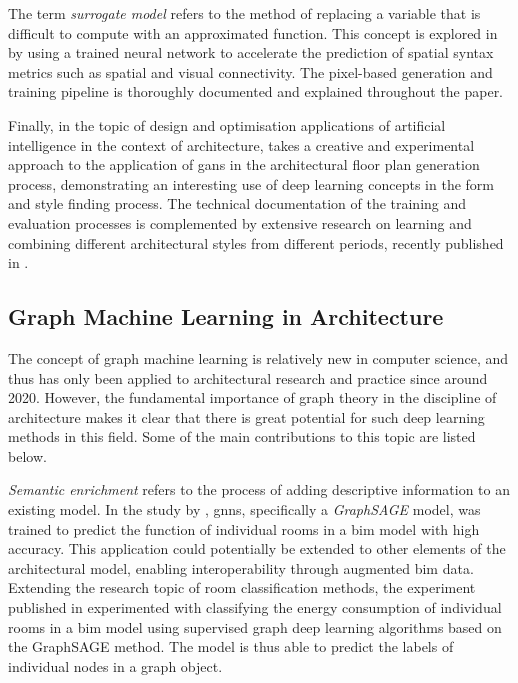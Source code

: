 \documentclass[a4paper, 12pt]{report}
\begin{document}
The term \textit{surrogate model} refers to the method of replacing a variable that is difficult to compute with an approximated function. This concept is explored in  by \citeauthor{tarabishy2020deep} using a trained neural network to accelerate the prediction of spatial syntax metrics such as spatial and visual connectivity. The pixel-based generation and training pipeline is thoroughly documented and explained throughout the paper.

Finally, in the topic of design and optimisation applications of artificial intelligence in the context of architecture, \citeauthor{chaillou2021ai} takes a creative and experimental approach to the application of \acrshort{gans} in the architectural floor plan generation process, demonstrating an interesting use of deep learning concepts in the form and style finding process. The technical documentation of the training and evaluation processes is complemented by extensive research on learning and combining different architectural styles from different periods, recently published in \citeyear{chaillou2021ai}.

\subsection{Graph Machine Learning in Architecture}\label{subsec:graph-machine-learning-in-architecture}

The concept of graph machine learning is relatively new in computer science, and thus has only been applied to architectural research and practice since around 2020. However, the fundamental importance of graph theory in the discipline of architecture makes it clear that there is great potential for such deep learning methods in this field. Some of the main contributions to this topic are listed below.

\textit{Semantic enrichment} refers to the process of adding descriptive information to an existing model. In the study  by \citeauthor{wang2021room}, \acrlong{gnns}, specifically a \textit{GraphSAGE} model, was trained to predict the function of individual rooms in a \acrshort{bim} model with high accuracy. This application could potentially be extended to other elements of the architectural model, enabling interoperability through augmented \acrshort{bim} data. Extending the research topic of room classification methods, the  experiment published in \citeyear{kiavarz2021room} experimented with classifying the energy consumption of individual rooms in a \acrshort{bim} model using supervised graph deep learning algorithms based on the GraphSAGE method. The model is thus able to predict the labels of individual nodes in a graph object.
\end{document}
